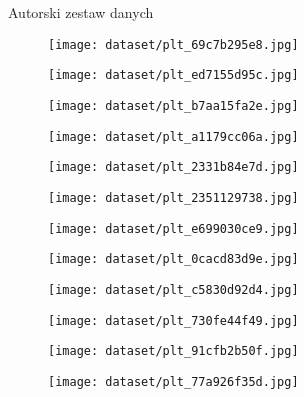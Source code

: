 \begin{easyappendix}{Autorski zestaw danych}
    \begin{figure}[H]
        \centering
        \texttt{[image: dataset/plt\_69c7b295e8.jpg]}
    \end{figure}
    \begin{figure}[H]
        \centering
        \texttt{[image: dataset/plt\_ed7155d95c.jpg]}
    \end{figure}
    \begin{figure}[H]
        \centering
        \texttt{[image: dataset/plt\_b7aa15fa2e.jpg]}
    \end{figure}
    \begin{figure}[H]
        \centering
        \texttt{[image: dataset/plt\_a1179cc06a.jpg]}
    \end{figure}
    \begin{figure}[H]
        \centering
        \texttt{[image: dataset/plt\_2331b84e7d.jpg]}
    \end{figure}
    \begin{figure}[H]
        \centering
        \texttt{[image: dataset/plt\_2351129738.jpg]}
    \end{figure}
    \begin{figure}[H]
        \centering
        \texttt{[image: dataset/plt\_e699030ce9.jpg]}
    \end{figure}
    \begin{figure}[H]
        \centering
        \texttt{[image: dataset/plt\_0cacd83d9e.jpg]}
    \end{figure}
    \begin{figure}[H]
        \centering
        \texttt{[image: dataset/plt\_c5830d92d4.jpg]}
    \end{figure}
    \begin{figure}[H]
        \centering
        \texttt{[image: dataset/plt\_730fe44f49.jpg]}
    \end{figure}
    \begin{figure}[H]
        \centering
        \texttt{[image: dataset/plt\_91cfb2b50f.jpg]}
    \end{figure}
    \begin{figure}[H]
        \centering
        \texttt{[image: dataset/plt\_77a926f35d.jpg]}
    \end{figure}
    \begin{figure}[H]

\end{figure}
\end{easyappendix}
